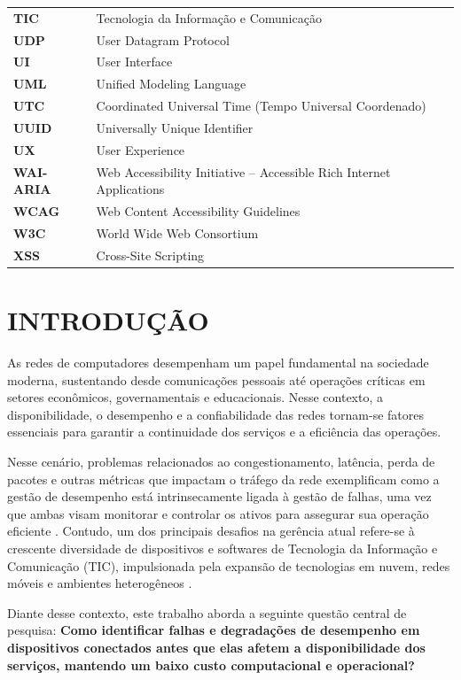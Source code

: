 \documentclass[12pt,a4paper]{article}
\begin{document}
\begin{longtable}{@{}>{\bfseries}p{2.2cm}p{11.5cm}@{}}
TIC & Tecnologia da Informação e Comunicação \\
UDP & User Datagram Protocol \\
UI & User Interface \\
UML & Unified Modeling Language \\
UTC & Coordinated Universal Time (Tempo Universal Coordenado) \\
UUID & Universally Unique Identifier \\
UX & User Experience \\
WAI-ARIA & Web Accessibility Initiative -- Accessible Rich Internet Applications \\
WCAG & Web Content Accessibility Guidelines \\
W3C & World Wide Web Consortium \\
XSS & Cross-Site Scripting \\
\end{longtable}
\clearpage

\tableofcontents
\clearpage
\hypersetup{pageanchor=true}
\setcounter{page}{1}

\section{INTRODUÇÃO}
As redes de computadores desempenham um papel fundamental na sociedade moderna, sustentando desde comunicações pessoais até operações críticas em setores econômicos, governamentais e educacionais. Nesse contexto, a disponibilidade, o desempenho e a confiabilidade das redes tornam-se fatores essenciais para garantir a continuidade dos serviços e a eficiência das operações.

Nesse cenário, problemas relacionados ao congestionamento, latência, perda de pacotes e outras métricas que impactam o tráfego da rede exemplificam como a gestão de desempenho está intrinsecamente ligada à gestão de falhas, uma vez que ambas visam monitorar e controlar os ativos para assegurar sua operação eficiente \cite{silva2024zabbix}. Contudo, um dos principais desafios na gerência atual refere-se à crescente diversidade de dispositivos e softwares de Tecnologia da Informação e Comunicação (TIC), impulsionada pela expansão de tecnologias em nuvem, redes móveis e ambientes heterogêneos \cite{basso2020administracao}.

Diante desse contexto, este trabalho aborda a seguinte questão central de pesquisa: \textbf{Como identificar falhas e degradações de desempenho em dispositivos conectados antes que elas afetem a disponibilidade dos serviços, mantendo um baixo custo computacional e operacional?}
\end{document}
